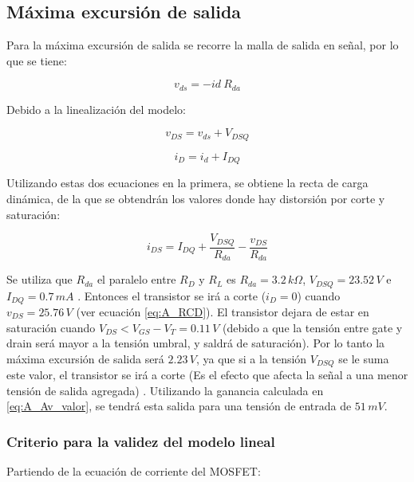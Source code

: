 \documentclass[10pt,spanish,a4paper,notitlepage]{article}
\begin{document}
\subsection{Máxima excursión de salida}

Para la máxima excursión de salida se recorre la malla de salida en señal, por lo que se tiene:

\begin{equation}
    v_{ds}=-id\ R_{da}
\end{equation}

Debido a la linealización del modelo:

\begin{equation}
    v_{DS}=v_{ds}+V_{DSQ}
\end{equation}

\begin{equation}
    i_{D}=i_{d}+I_{DQ}
\end{equation}

Utilizando estas dos ecuaciones en la primera, se obtiene la recta de carga dinámica, de la que se obtendrán los valores donde hay distorsión por corte y saturación:

\begin{equation}
    i_{DS}=I_{DQ}+\frac{V_{DSQ}}{R_{da}}-\frac{v_{DS}}{R_{da}}
    \label{eq:A_RCD}
\end{equation}

Se utiliza que $R_{da}$ el paralelo entre $R_{D}$ y $R_{L}$ es $R_{da}=3.2\,\unit{k\Omega}$, $V_{DSQ}=23.52\,\unit{V}$ e $I_{DQ}=0.7\,\unit{mA}$ . Entonces el transistor se irá a corte ($i_{D}=0$) cuando $v_{DS}=25.76\,\unit{V}$ (ver ecuación \ref{eq:A_RCD}). 
El transistor dejara de estar en saturación cuando $V_{DS}<V_{GS}-V_{T}=0.11\,\unit{V}$ (debido a que la tensión entre gate y drain será mayor a la tensión umbral, y saldrá de saturación). Por lo tanto la máxima excursión de salida será $2.23\,\unit{V}$, ya que si a la tensión $V_{DSQ}$ se le suma este valor, el transistor se irá a corte (Es el efecto que afecta la señal a una menor tensión de salida agregada) . Utilizando la ganancia calculada en \ref{eq:A_Av_valor}, se tendrá esta salida para una tensión de entrada de $51\,\unit{mV}$. \\

\subsubsection{Criterio para la validez del modelo lineal}

Partiendo de la ecuación de corriente del MOSFET:
\end{document}
